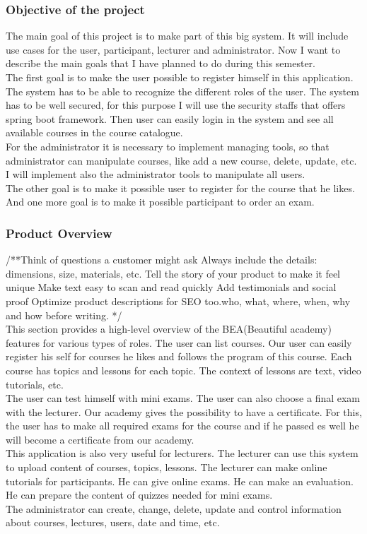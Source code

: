 \documentclass{scrartcl}
\begin{document}
  	\subsubsection{Objective of the project}
  	The main goal of this project is to make part of this big system. It will include use cases for the user, participant, lecturer and administrator. 
  Now I want to describe the main goals that I have planned to do during this semester. \\The first goal is to make the user possible to register himself in this application. The system has to be able to recognize the different roles of the user. The system has to be well secured, for this purpose I will use the security staffs that offers spring boot framework. Then user can easily login in the system and see all available courses in the course catalogue. \\
  For the administrator it is necessary to implement managing tools, so that administrator can manipulate courses, like add a new course, delete, update, etc. I will implement also the administrator tools to manipulate all users.\\
  The other goal is to make it possible user to register for the course that he likes. And one more goal is to make it possible participant to order an exam. 
  
  
  	\subsubsection{Product Overview}
  	/**Think of questions a customer might ask
Always include the details: dimensions, size, materials, etc.
Tell the story of your product to make it feel unique
Make text easy to scan and read quickly
Add testimonials and social proof
Optimize product descriptions for SEO too.who, what, where, when, why and how before writing. */\\
  	This section provides a high-level overview of the BEA(Beautiful academy) features for various types of roles.
 The user can list courses. 
 Our user can easily register his self for courses he likes and follows the program of this course. Each course has topics and lessons for each topic. The context of lessons are text, video tutorials, etc. \\
  	The user can test himself with mini exams. The user can also choose a final exam with the lecturer. Our academy gives the possibility to have a certificate. For this, the user has to make all required exams for the course and if he passed es well he will become a certificate from our academy. \\
  	This application is also very useful for lecturers. The lecturer can use this system to upload content of courses, topics, lessons. The lecturer can make online tutorials for participants. He can give online exams. He can make an evaluation. He can prepare the content of quizzes needed for mini exams.\\
  	The administrator can create, change, delete, update and control information about courses, lectures, users, date and time, etc.
  	
\end{document}
